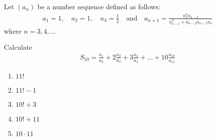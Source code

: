 Let $(a_{n})$ be a number sequence defined as follows:
\begin{align*}
a_{1} = 1, \quad
a_{2} = 1, \quad 
a_{3} = \frac{1}{2} \quad
\text{and}\quad
a_{n+1} = \frac{a_{n}^{3}a_{n-2}}{a_{n-1}^{3}+a_{n-2}a_{n-1}a_{n}} 
\end{align*}
where $n=3,4,\ldots$

Calculate
\begin{align*}
S_{10} 
= \frac{a_{1}}{a_{2}} 
+ 2 \frac{a_{2}}{a_{3}} 
+ 3 \frac{a_{3}}{a_{4}} 
+ \ldots 
+ 10 \frac{a_{10}}{a_{11}} 
\end{align*}

\begin{enumerate}
\item $11!$
\item $11!-1$
\item $10!+3$
\item $10!+11$
\item $10 \cdot 11$
\end{enumerate}
